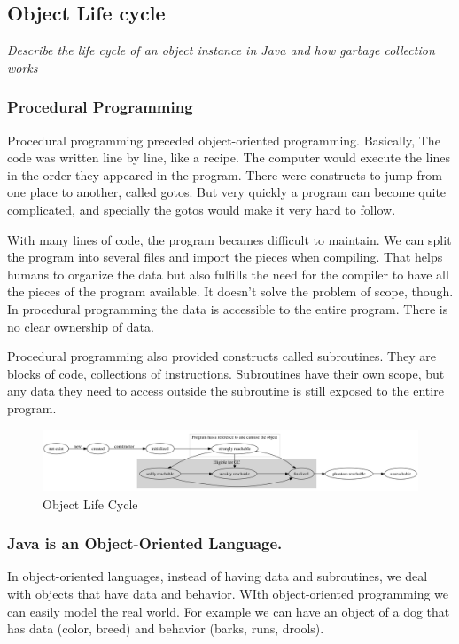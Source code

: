 \subsection{Object Life cycle}
\begin{center}\textit{Describe the life cycle of an object instance in Java and how garbage collection works}\end{center}

\subsubsection{Procedural Programming} 
Procedural programming preceded object-oriented programming. Basically, The code was written line by line, like a recipe. The computer would execute the lines in the order they appeared in the program. There were constructs to jump from one place to another, called gotos. But very quickly a program can become quite complicated, and specially the gotos would make it very hard to follow. 

With many lines of code, the program becames difficult to maintain. We can split the program into several files and import the pieces when compiling. That helps humans to organize the data but also fulfills the need for the compiler to have all the pieces of the program available. It doesn't solve the problem of scope, though. In procedural programming the data is accessible to the entire program. There is no clear ownership of data.

Procedural programming also provided constructs called subroutines. They are blocks of code, collections of instructions. Subroutines have their own scope, but any data they need to access outside the subroutine is still exposed to the entire program.

\begin{figure}[!htp]\centering %
\includegraphics[width=\textwidth]{object-life-cycle.png}
\caption{Object Life Cycle}
\label{fig:object-life-cycle}
\end{figure}

\subsubsection{Java is an Object-Oriented Language.} In object-oriented languages, instead of having data and subroutines, we deal with objects that have data and behavior. WIth object-oriented programming we can easily model the real world. For example we can have an object of a dog that has data (color, breed) and behavior (barks, runs, drools). 

